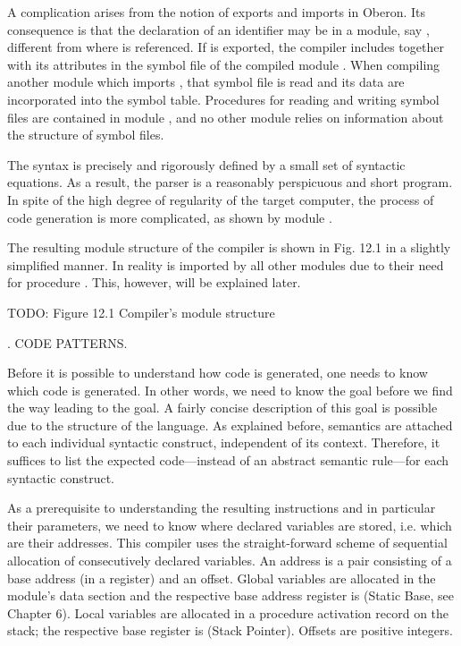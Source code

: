 A complication arises from the notion of exports and imports in Oberon. Its consequence is that the declaration of an identifier  may be in a module, say , different from where  is referenced. If  is exported, the compiler includes  together with its attributes in the symbol file of the compiled module . When compiling another module which imports , that symbol file is read and its data are incorporated into the symbol table. Procedures for reading and writing symbol files are contained in module , and no other module relies on information about the structure of symbol files.

The syntax is precisely and rigorously defined by a small set of syntactic equations. As a result, the parser is a reasonably perspicuous and short program. In spite of the high degree of regularity of the target computer, the process of code generation is more complicated, as shown by module .

The resulting module structure of the compiler is shown in Fig. 12.1 in a slightly simplified manner. In reality  is imported by all other modules due to their need for procedure . This, however, will be explained later.

TODO: Figure 12.1 Compiler's module structure

. CODE PATTERNS.

Before it is possible to understand how code is generated, one needs to know which code is generated. In other words, we need to know the goal before we find the way leading to the goal. A fairly concise description of this goal is possible due to the structure of the language. As explained before, semantics are attached to each individual syntactic construct, independent of its context. Therefore, it suffices to list the expected code---instead of an abstract semantic rule---for each syntactic construct.

As a prerequisite to understanding the resulting instructions and in particular their parameters, we need to know where declared variables are stored, i.e. which are their addresses. This compiler uses the straight-forward scheme of sequential allocation of consecutively declared variables. An address is a pair consisting of a base address (in a register) and an offset. Global variables are allocated in the module's data section and the respective base address register is  (Static Base, see Chapter 6). Local variables are allocated in a procedure activation record on the stack; the respective base register is  (Stack Pointer). Offsets are positive integers.

